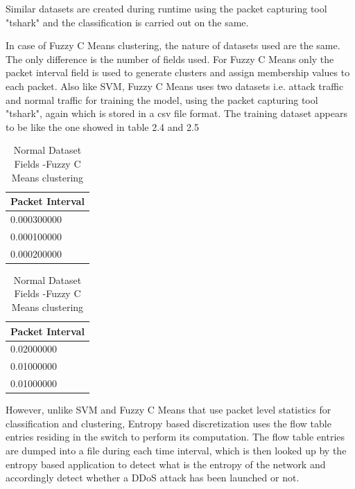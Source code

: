 \documentclass[12pt,a4paper,final]{report}
\begin{document}
Similar datasets are created during runtime using the packet capturing tool "tshark" and the classification is carried out on the same.
\newline

In case of Fuzzy C Means clustering, the nature of datasets used are the same. The only difference is the number of fields used. For Fuzzy C Means only the packet interval field is used to generate clusters and assign membership values to each packet. Also like SVM, Fuzzy C Means uses two datasets i.e. attack traffic and normal traffic for training the model, using the packet capturing tool "tshark", again which is stored in a csv file format. The training dataset appears to be like the one showed in table 2.4 and 2.5

\begin{table}[h]
\begin{center}
\begin{tabular}{|p{3cm}|}
\hline 
\textbf{Packet Interval} \\ 
\hline 
0.000300000 \\ 
\hline
0.000100000 \\ 
\hline
0.000200000 \\ 
\hline
\end{tabular} 
\end{center}
\caption{Attack Dataset Fields - Fuzzy C Means clustering}

\begin{center}
\begin{tabular}{|p{3cm}|}
\hline 
\textbf{Packet Interval} \\ 
\hline 
0.02000000 \\ 
\hline
0.01000000 \\ 
\hline
0.01000000 \\ 
\hline
\end{tabular} 
\end{center}
\caption{Normal Dataset Fields -Fuzzy C Means clustering}
\end{table}

However, unlike SVM and Fuzzy C Means that use packet level statistics for classification and clustering, Entropy based discretization uses the flow table entries residing in the switch to perform its computation. The flow table entries are dumped into a file during each time interval, which is then looked up by the entropy based application to detect what is the entropy of the network and accordingly detect whether a DDoS attack has been launched or not.
\newline
\end{document}
